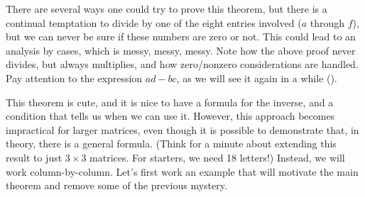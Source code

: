 %
There are several ways one could try to prove this theorem, but there is a continual temptation to divide by one of the eight entries involved ($a$ through $f$), but we can never be sure if these numbers are zero or not.  This could lead to an analysis by cases, which is messy, messy, messy.  Note how the above proof never divides, but always multiplies, and how zero/nonzero considerations are handled.  Pay attention to the expression $ad-bc$, as we will see it again in a while ().\par
%
This theorem is cute, and it is nice to have a formula for the inverse, and a condition that tells us when we can use it.  However, this approach becomes impractical for larger matrices, even though it is possible to demonstrate that, in theory, there is a general formula.  (Think for a minute about extending this result to just $3\times 3$ matrices.  For starters, we need 18 letters!)  Instead, we will work column-by-column.  Let's first work an example that will motivate the main theorem and remove some of the previous mystery.
%
